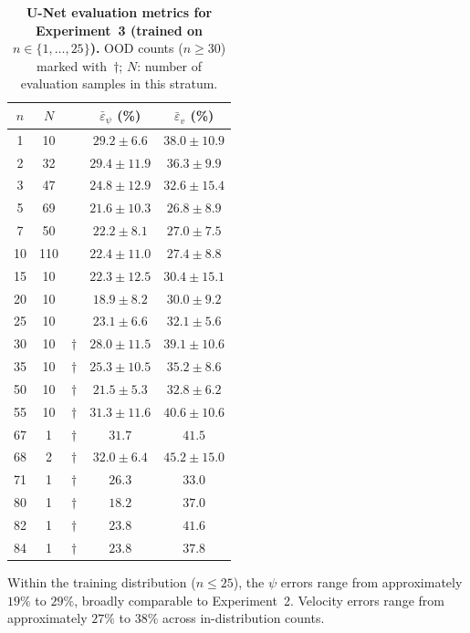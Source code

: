 \begin{table}[htbp]
\centering
\caption{\textbf{U-Net evaluation metrics for Experiment~3 (trained on $n \in \{1,\ldots,25\}$).}
         OOD counts ($n \geq 30$) marked with~$\dagger$; $N$: number of evaluation samples in this stratum.}
\label{tab:unet_metrics_exp3}
\setlength{\tabcolsep}{12pt}
\begin{tabular}{ccccc}
\toprule
$n$ & $N$ & & $\bar{\varepsilon}_\psi$ (\%) & $\bar{\varepsilon}_v$ (\%) \\
\midrule
1  & 10  & & $29.2 \pm 6.6$  & $38.0 \pm 10.9$ \\
2  & 32  & & $29.4 \pm 11.9$ & $36.3 \pm 9.9$ \\
3  & 47  & & $24.8 \pm 12.9$ & $32.6 \pm 15.4$ \\
5  & 69  & & $21.6 \pm 10.3$ & $26.8 \pm 8.9$ \\
7  & 50  & & $22.2 \pm 8.1$  & $27.0 \pm 7.5$ \\
10 & 110 & & $22.4 \pm 11.0$ & $27.4 \pm 8.8$ \\
15 & 10  & & $22.3 \pm 12.5$ & $30.4 \pm 15.1$ \\
20 & 10  & & $18.9 \pm 8.2$  & $30.0 \pm 9.2$ \\
25 & 10  & & $23.1 \pm 6.6$  & $32.1 \pm 5.6$ \\
\midrule
30 & 10 & $\dagger$ & $28.0 \pm 11.5$ & $39.1 \pm 10.6$ \\
35 & 10 & $\dagger$ & $25.3 \pm 10.5$ & $35.2 \pm 8.6$ \\
50 & 10 & $\dagger$ & $21.5 \pm 5.3$  & $32.8 \pm 6.2$ \\
55 & 10 & $\dagger$ & $31.3 \pm 11.6$ & $40.6 \pm 10.6$ \\
67 &  1 & $\dagger$ & $31.7$          & $41.5$          \\
68 &  2 & $\dagger$ & $32.0 \pm 6.4$  & $45.2 \pm 15.0$ \\
71 &  1 & $\dagger$ & $26.3$          & $33.0$          \\
80 &  1 & $\dagger$ & $18.2$          & $37.0$          \\
82 &  1 & $\dagger$ & $23.8$          & $41.6$          \\
84 &  1 & $\dagger$ & $23.8$          & $37.8$          \\
\bottomrule
\end{tabular}
\end{table}

Within the training distribution ($n \leq 25$), the $\psi$ errors range from approximately $19\%$ to $29\%$, broadly comparable to Experiment~2. Velocity errors range from approximately $27\%$ to $38\%$ across in-distribution counts.

